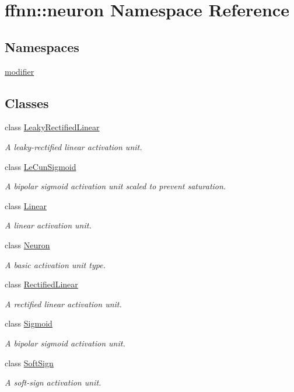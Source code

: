 \hypertarget{namespaceffnn_1_1neuron}{\section{ffnn\-:\-:neuron Namespace Reference}
\label{namespaceffnn_1_1neuron}
}
\subsection*{Namespaces}
\begin{DoxyCompactItemize}
\item 
\hyperlink{namespaceffnn_1_1neuron_1_1modifier}{modifier}
\end{DoxyCompactItemize}
\subsection*{Classes}
\begin{DoxyCompactItemize}
\item 
class \hyperlink{classffnn_1_1neuron_1_1_leaky_rectified_linear}{Leaky\-Rectified\-Linear}
\begin{DoxyCompactList}\small\item\em A leaky-\/rectified linear activation unit. \end{DoxyCompactList}\item 
class \hyperlink{classffnn_1_1neuron_1_1_le_cun_sigmoid}{Le\-Cun\-Sigmoid}
\begin{DoxyCompactList}\small\item\em A bipolar sigmoid activation unit scaled to prevent saturation. \end{DoxyCompactList}\item 
class \hyperlink{classffnn_1_1neuron_1_1_linear}{Linear}
\begin{DoxyCompactList}\small\item\em A linear activation unit. \end{DoxyCompactList}\item 
class \hyperlink{classffnn_1_1neuron_1_1_neuron}{Neuron}
\begin{DoxyCompactList}\small\item\em A basic activation unit type. \end{DoxyCompactList}\item 
class \hyperlink{classffnn_1_1neuron_1_1_rectified_linear}{Rectified\-Linear}
\begin{DoxyCompactList}\small\item\em A rectified linear activation unit. \end{DoxyCompactList}\item 
class \hyperlink{classffnn_1_1neuron_1_1_sigmoid}{Sigmoid}
\begin{DoxyCompactList}\small\item\em A bipolar sigmoid activation unit. \end{DoxyCompactList}\item 
class \hyperlink{classffnn_1_1neuron_1_1_soft_sign}{Soft\-Sign}
\begin{DoxyCompactList}\small\item\em A soft-\/sign activation unit. \end{DoxyCompactList}\end{DoxyCompactItemize}

